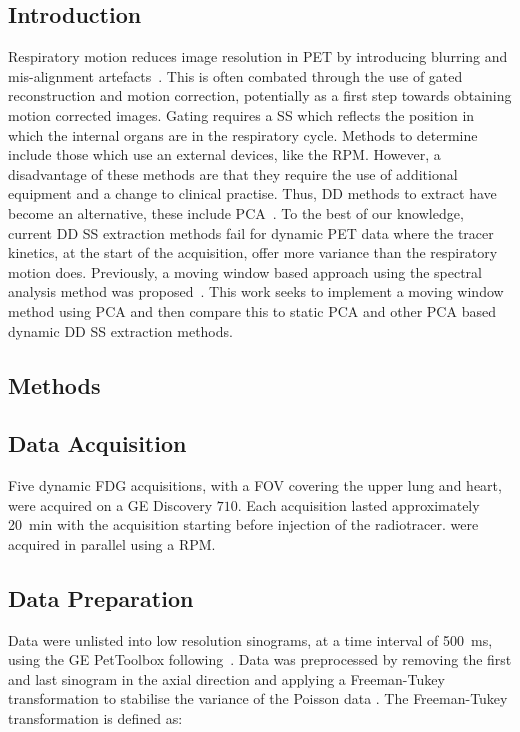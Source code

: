         \subsection{Introduction} \label{sec:pca_data_driven_surrogate_signal_extraction_methods_for_dynamic_pet_introduction}
            Respiratory motion reduces image resolution in \gls{PET} by introducing blurring and mis-alignment artefacts~\cite{Nehmeh2008a}. This is often combated through the use of gated reconstruction and motion correction, potentially as a first step towards obtaining motion corrected images. Gating requires a \gls{SS} which reflects the position in which the internal organs are in the respiratory cycle. Methods to determine  include those which use an external devices, like the \gls{RPM}. However, a disadvantage of these methods are that they require the use of additional equipment and a change to clinical practise. Thus, \gls{DD} methods to extract  have become an alternative, these include \gls{PCA}~\cite{Thielemans2011}. To the best of our knowledge, current \gls{DD} \gls{SS} extraction methods fail for dynamic \gls{PET} data where the tracer kinetics, at the start of the acquisition, offer more variance than the respiratory motion does. Previously, a moving window based approach using the spectral analysis method was proposed~\cite{Schleyer2014}. This work seeks to implement a moving window method using \gls{PCA} and then compare this to static \gls{PCA} and other \gls{PCA} based dynamic \gls{DD} \gls{SS} extraction methods.
        
        \subsection{Methods} \label{sec:pca_data_driven_surrogate_signal_extraction_methods_for_dynamic_pet_methods}
            \subsection{Data Acquisition} \label{sec:pca_data_driven_surrogate_signal_extraction_methods_for_dynamic_pet_methods_data_acquisition}
                Five dynamic \gls{FDG} acquisitions, with a \gls{FOV} covering the upper lung and heart, were acquired on a \gls{GE} Discovery $710$. Each acquisition lasted approximately \SI{20}{\minute} with the acquisition starting before injection of the radiotracer.  were acquired in parallel using a \gls{RPM}.
                
            \subsection{Data Preparation} \label{sec:pca_data_driven_surrogate_signal_extraction_methods_for_dynamic_pet_methods_data_preparation}
                Data were unlisted into low resolution sinograms, at a time interval of \SI{500}{\milli\second}, using the \gls{GE} PetToolbox following~\cite{Bertolli2018Data-DrivenTomography}. Data was preprocessed by removing the first and last sinogram in the axial direction and applying a Freeman-Tukey transformation to stabilise the variance of the Poisson data \cite{Freeman1950TransformationsRoot}. The Freeman-Tukey transformation is defined as:

